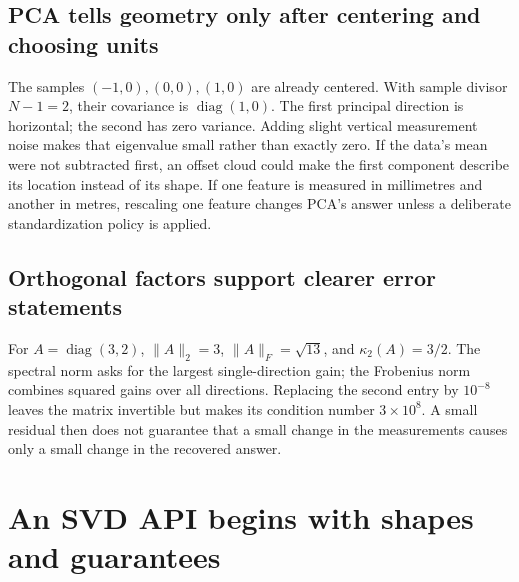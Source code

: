 \subsection{PCA tells geometry only after centering and choosing units}\label{02-foundations-ii-ch038-pca-tells-geometry-only-after-centering-and-choosing-units}

\hypertarget{02-foundations-ii-ch038-pca-tells-geometry-only-after-centering-and-choosing-units}{}

The samples \((-1,0),(0,0),(1,0)\) are already centered. With sample divisor \(N-1=2\), their covariance is \(\operatorname{diag}(1,0)\). The first principal direction is horizontal; the second has zero variance. Adding slight vertical measurement noise makes that eigenvalue small rather than exactly zero. If the data's mean were not subtracted first, an offset cloud could make the first component describe its location instead of its shape. If one feature is measured in millimetres and another in metres, rescaling one feature changes PCA's answer unless a deliberate standardization policy is applied.

\subsection{Orthogonal factors support clearer error statements}\label{02-foundations-ii-ch038-orthogonal-factors-support-clearer-error-statements}

\hypertarget{02-foundations-ii-ch038-orthogonal-factors-support-clearer-error-statements}{}

For \(A=\operatorname{diag}(3,2)\), \(\|A\|_2=3\), \(\|A\|_F=\sqrt{13}\), and \(\kappa_2(A)=3/2\). The spectral norm asks for the largest single-direction gain; the Frobenius norm combines squared gains over all directions. Replacing the second entry by \(10^{-8}\) leaves the matrix invertible but makes its condition number \(3\times10^8\). A small residual then does not guarantee that a small change in the measurements causes only a small change in the recovered answer.

\section{An SVD API begins with shapes and guarantees}\label{02-foundations-ii-ch038-an-svd-api-begins-with-shapes-and-guarantees}

\hypertarget{02-foundations-ii-ch038-an-svd-api-begins-with-shapes-and-guarantees}{}

